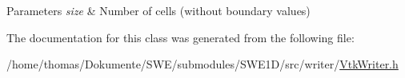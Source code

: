 \begin{DoxyParams}{Parameters}
{\em size} & Number of cells (without boundary values) \\
\hline
\end{DoxyParams}


The documentation for this class was generated from the following file\-:\begin{DoxyCompactItemize}
\item 
/home/thomas/\-Dokumente/\-S\-W\-E/submodules/\-S\-W\-E1\-D/src/writer/\hyperlink{VtkWriter_8h}{Vtk\-Writer.\-h}\end{DoxyCompactItemize}
